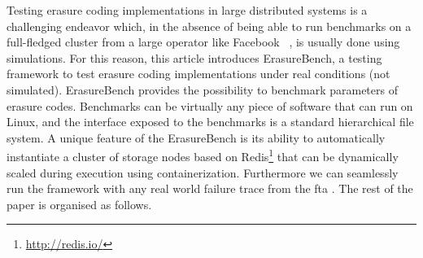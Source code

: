 




Testing erasure coding implementations in large distributed systems is a challenging endeavor which, in the absence of being able to run benchmarks on a full-fledged cluster from a large operator like Facebook~\autocite{XorbasVLDB} , is usually done using simulations. For this reason, this article introduces ErasureBench, a testing framework to test erasure coding implementations under real conditions (not simulated). ErasureBench provides the possibility to benchmark parameters of erasure codes. Benchmarks can be virtually any piece of software that can run on Linux, and the interface exposed to the benchmarks is a standard hierarchical file system. A unique feature of the ErasureBench is its ability to automatically instantiate a cluster of storage nodes based on Redis\footnote{\url{http://redis.io/}} that can be dynamically scaled during execution using containerization.
Furthermore we can seamlessly run the framework with any real world failure trace from the \ac{fta} \autocite{fta-journal,fta-paper}. The rest of the paper is organised as follows. 

